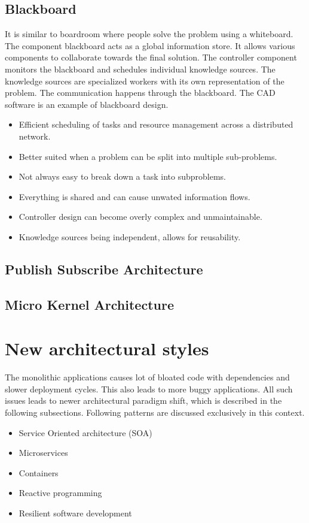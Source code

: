 \documentclass[conference]{IEEEtran}
\begin{document}
\subsection{Blackboard}
It is similar to boardroom where people solve the problem using a whiteboard. The component blackboard acts as a global information store. It allows various components to collaborate towards the final solution. The controller component monitors the blackboard and schedules individual knowledge sources. The knowledge sources are specialized workers with its own representation of the problem. The communication happens through the blackboard. The CAD software is an example of blackboard design.
\begin{itemize}
\item Efficient scheduling of tasks and resource management across a distributed network.
\item Better suited when a problem can be split into multiple sub-problems.
\item Not always easy to break down a task into subproblems.
\item Everything is shared and can cause unwated information flows.
\item Controller design can become overly complex and unmaintainable.
\item Knowledge sources being independent, allows for reusability.
\end{itemize}

\subsection{Publish Subscribe Architecture}
\subsection{Micro Kernel Architecture}

\section{New architectural styles}
The monolithic applications causes lot of bloated code with dependencies and slower deployment cycles. This also leads to more buggy applications.
All such issues leads to newer architectural paradigm shift, which is described in the following subsections. Following patterns are discussed exclusively in this context.
\begin{itemize}
\item Service Oriented architecture (SOA)
\item Microservices
\item Containers
\item Reactive programming
\item Resilient software development
\end{itemize}
\end{document}
